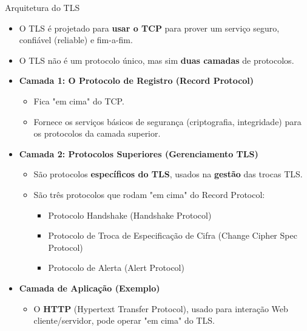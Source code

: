 \begin{frame}{Arquitetura do TLS}
    \begin{itemize}
        \item O TLS é projetado para \textbf{usar o TCP} para prover um serviço seguro, confiável (reliable) e fim-a-fim.

        \item O TLS não é um protocolo único, mas sim \textbf{duas camadas} de protocolos.

        \item \textbf{Camada 1: O Protocolo de Registro (Record Protocol)}
              \begin{itemize}
                  \item Fica "em cima" do TCP.
                  \item Fornece os serviços básicos de segurança (criptografia, integridade) para os protocolos da camada superior.
              \end{itemize}

        \item \textbf{Camada 2: Protocolos Superiores (Gerenciamento TLS)}
              \begin{itemize}
                  \item São protocolos \textbf{específicos do TLS}, usados na \textbf{gestão} das trocas TLS.
                  \item São três protocolos que rodam "em cima" do Record Protocol:
                        \begin{itemize}
                            \item Protocolo Handshake (Handshake Protocol)
                            \item Protocolo de Troca de Especificação de Cifra (Change Cipher Spec Protocol)
                            \item Protocolo de Alerta (Alert Protocol)
                        \end{itemize}
              \end{itemize}

        \item \textbf{Camada de Aplicação (Exemplo)}
              \begin{itemize}
                  \item O \textbf{HTTP} (Hypertext Transfer Protocol), usado para interação Web cliente/servidor, pode operar "em cima" do TLS.
              \end{itemize}
    \end{itemize}
\end{frame}

